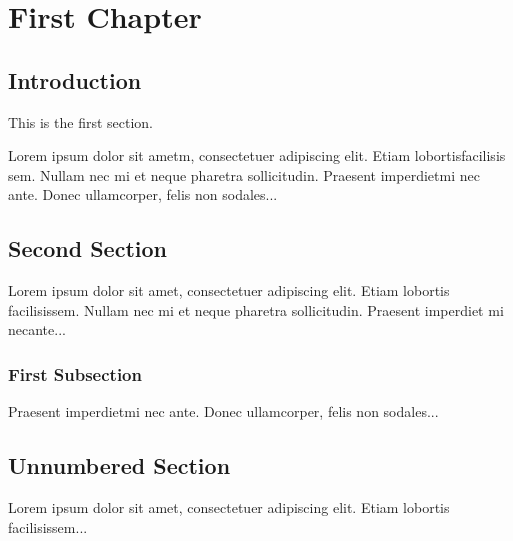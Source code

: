 \documentclass{book}
\begin{document}
	
	\chapter{First Chapter}
	
	\section {Introduction}
	
	This is the first section.
	
	Lorem ipsum dolor sit ametm, consectetuer adipiscing 
	elit. Etiam  lobortisfacilisis sem.  Nullam nec mi et 
	neque pharetra sollicitudin.  Praesent imperdietmi nec ante. 
	Donec ullamcorper, felis non sodales...
	
	\section{Second Section}
	
	Lorem ipsum dolor sit amet, consectetuer adipiscing elit.  
	Etiam lobortis facilisissem.  Nullam nec mi et neque pharetra 
	sollicitudin.  Praesent imperdiet mi necante...
	
	\subsection{First Subsection}
	
	Praesent imperdietmi nec ante. Donec ullamcorper, felis non sodales...
	
	\section*{Unnumbered Section}
	
	Lorem ipsum dolor sit amet, consectetuer adipiscing elit.  
	Etiam lobortis facilisissem...
\end{document}
